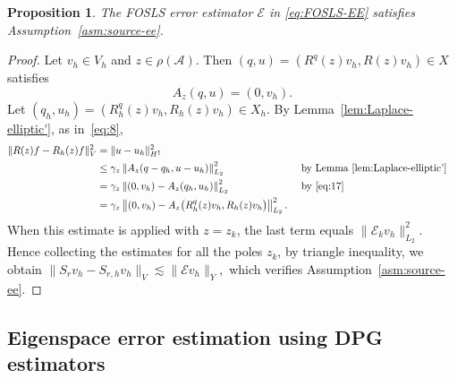 \documentclass[12pt, oneside, reqno]{amsart}
\newtheorem{proposition}[theorem]{Proposition}
\theoremstyle{remark}
\newcommand{\Srh}{S_{r, h}}
\newcommand{\EE}{\mathcal{E}}
\newcommand{\Ac}{\mathcal{A}}
\newcommand{\Af}{{A}}
\begin{document}
\begin{proposition}
  The FOSLS error estimator $\EE$ in \eqref{eq:FOSLS-EE} satisfies
  Assumption~\ref{asm:source-ee}.
\end{proposition}
\begin{proof}
  Let $v_h \in V_h$ and $z \in \rho (\Ac)$. Then
  $(q, u) = (R^q(z) v_h, R(z) v_h) \in X$ satisfies
  \begin{equation}
    \label{eq:17}
      \Af_z(q, u) = (0, v_h).
  \end{equation}
  Let
  $(q_h, u_h) = (R_h^q(z) v_h, R_h(z) v_h) \in X_h$.  
  By Lemma~\ref{lem:Laplace-elliptic'}, as in~\eqref{eq:8}, 
  \begin{align*}
    \| R(z) f - R_h(z) f\|_V^2
    & = \| u - u_h \|_{H^1}^2
    \\
    &
      \le \gamma_z
      \left\| \Af_z( q - q_h, u- u_h) \right\|_{L_2}^2
    && \text{ by Lemma~\ref{lem:Laplace-elliptic'}}
    \\
    &
      = \gamma_z
      \left\| (0, v_h) -\Af_z( q_h, u_h) \right\|_{L_2}^2
    && \text{ by~\eqref{eq:17}}
    \\
    & = \gamma_z
    \left\| (0, v_h) -\Af_z\big( R_h^q(z) v_h, R_h(z) v_h\big) \right\|_{L_2}^2.      
  \end{align*}
  When this estimate is applied with $z = z_k$, the last term equals
  $\| \EE_k v_h \|_{L_2}^2$. Hence collecting the estimates for all
  the poles $z_k$, by triangle inequality, we obtain
  $ \| S_r v_h - \Srh v_h \|_V \lesssim \| \EE v_h\|_{Y}, $ which
  verifies Assumption~\ref{asm:source-ee}.
\end{proof}



\subsection{Eigenspace error estimation using DPG estimators}
\label{ssec:DPG}
\end{document}
